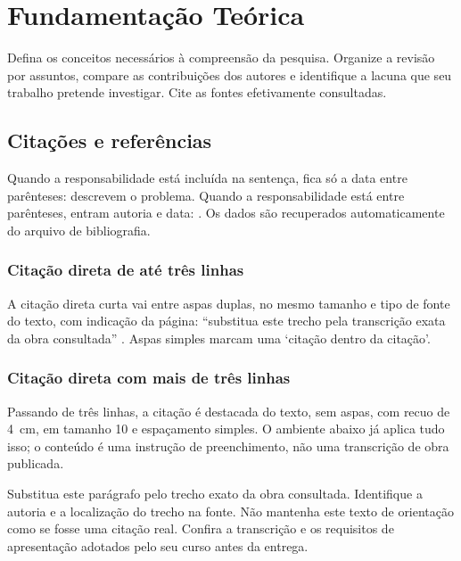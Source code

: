 \section{Fundamentação Teórica}
\label{sec:fundamentacao}

Defina os conceitos necessários à compreensão da pesquisa. Organize a revisão
por assuntos, compare as contribuições dos autores e identifique a lacuna que
seu trabalho pretende investigar. Cite as fontes efetivamente consultadas.

\subsection{Citações e referências}

Quando a responsabilidade está incluída na sentença, fica só a data entre
parênteses:  descrevem o problema.
Quando a responsabilidade está entre parênteses, entram autoria e data:
\cite{SilvaNeto2019Credibility}. Os dados são recuperados automaticamente
do arquivo de bibliografia.

\subsubsection{Citação direta de até três linhas}

A citação direta curta vai entre aspas duplas, no mesmo tamanho e tipo de
fonte do texto, com indicação da página: ``substitua este trecho pela
transcrição exata da obra consultada'' \cite[p.~7]{SilvaNeto2019Credibility}.
Aspas simples marcam uma `citação dentro da citação'.

\subsubsection{Citação direta com mais de três linhas}

Passando de três linhas, a citação é destacada do texto, sem aspas, com
recuo de 4~cm, em tamanho 10 e espaçamento simples. O ambiente abaixo já
aplica tudo isso; o conteúdo é uma instrução de preenchimento, não uma
transcrição de obra publicada.

\begin{citacao}
  Substitua este parágrafo pelo trecho exato da obra consultada. Identifique
  a autoria e a localização do trecho na fonte. Não mantenha este texto de
  orientação como se fosse uma citação real. Confira a transcrição e os
  requisitos de apresentação adotados pelo seu curso antes da entrega.
\end{citacao}

